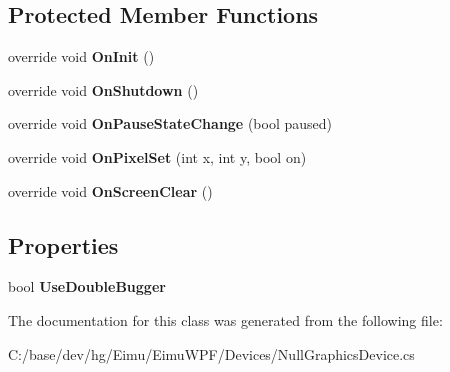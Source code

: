 \subsection*{Protected Member Functions}
\begin{DoxyCompactItemize}
\item 
\hypertarget{class_eimu_1_1_devices_1_1_null_graphics_device_a144d0af64efe168f2a4c7f21b6b62a8c}{
override void {\bfseries OnInit} ()}
\label{class_eimu_1_1_devices_1_1_null_graphics_device_a144d0af64efe168f2a4c7f21b6b62a8c}

\item 
\hypertarget{class_eimu_1_1_devices_1_1_null_graphics_device_a4f4fb82f48b62b77b4fccd3dbf6c56e0}{
override void {\bfseries OnShutdown} ()}
\label{class_eimu_1_1_devices_1_1_null_graphics_device_a4f4fb82f48b62b77b4fccd3dbf6c56e0}

\item 
\hypertarget{class_eimu_1_1_devices_1_1_null_graphics_device_a754b76b8fe71e88411357293254947ca}{
override void {\bfseries OnPauseStateChange} (bool paused)}
\label{class_eimu_1_1_devices_1_1_null_graphics_device_a754b76b8fe71e88411357293254947ca}

\item 
\hypertarget{class_eimu_1_1_devices_1_1_null_graphics_device_a194984eb4ed69e0d92639190a6692c18}{
override void {\bfseries OnPixelSet} (int x, int y, bool on)}
\label{class_eimu_1_1_devices_1_1_null_graphics_device_a194984eb4ed69e0d92639190a6692c18}

\item 
\hypertarget{class_eimu_1_1_devices_1_1_null_graphics_device_a7421d2b1b5988b9137fad8e5207c75cb}{
override void {\bfseries OnScreenClear} ()}
\label{class_eimu_1_1_devices_1_1_null_graphics_device_a7421d2b1b5988b9137fad8e5207c75cb}

\end{DoxyCompactItemize}
\subsection*{Properties}
\begin{DoxyCompactItemize}
\item 
\hypertarget{class_eimu_1_1_devices_1_1_null_graphics_device_a4ecb5d5a14ee5920cc9754921a088df2}{
bool {\bfseries UseDoubleBugger}}
\label{class_eimu_1_1_devices_1_1_null_graphics_device_a4ecb5d5a14ee5920cc9754921a088df2}

\end{DoxyCompactItemize}


The documentation for this class was generated from the following file:\begin{DoxyCompactItemize}
\item 
C:/base/dev/hg/Eimu/EimuWPF/Devices/NullGraphicsDevice.cs\end{DoxyCompactItemize}
